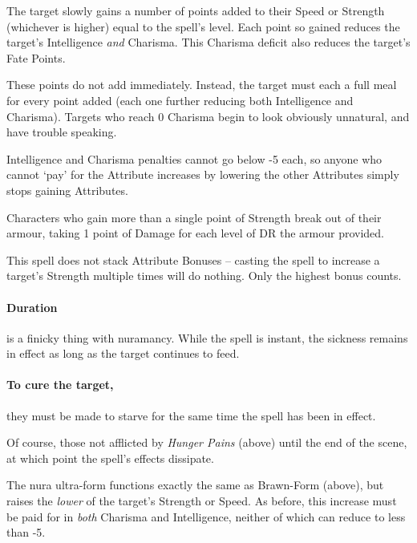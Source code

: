 \begin{multicols}{2}
The target slowly gains a number of points added to their Speed or Strength (whichever is higher) equal to the spell's level.
Each point so gained reduces the target's Intelligence \emph{and} Charisma.
This Charisma deficit also reduces the target's Fate Points.

These points do not add immediately.
Instead, the target must each a full meal for every point added (each one further reducing both Intelligence and Charisma).
Targets who reach 0 Charisma begin to look obviously unnatural, and have trouble speaking.

Intelligence and Charisma penalties cannot go below -5 each, so anyone who cannot `pay' for the Attribute increases by lowering the other Attributes simply stops gaining Attributes.

Characters who gain more than a single point of Strength break out of their armour, taking 1 point of Damage for each level of DR the armour provided.

This spell does not stack Attribute Bonuses -- casting the spell to increase a target's Strength multiple times will do nothing.
Only the highest bonus counts.

\paragraph{Duration}
is a finicky thing with nuramancy.
While the spell is instant, the sickness remains in effect as long as the target continues to feed.

\paragraph{To cure the target,}
they must be made to starve for the same time the spell has been in effect.
\label{nura_recovery}

Of course, those not afflicted by \textit{Hunger Pains} (above) until the end of the scene, at which point the spell's effects dissipate.

\spelllevel


The nura ultra-form functions exactly the same as Brawn-Form (above), but raises the \emph{lower} of the target's Strength or Speed.
As before, this increase must be paid for in \emph{both} Charisma and Intelligence, neither of which can reduce to less than -5.

\spelllevel


\end{multicols}
